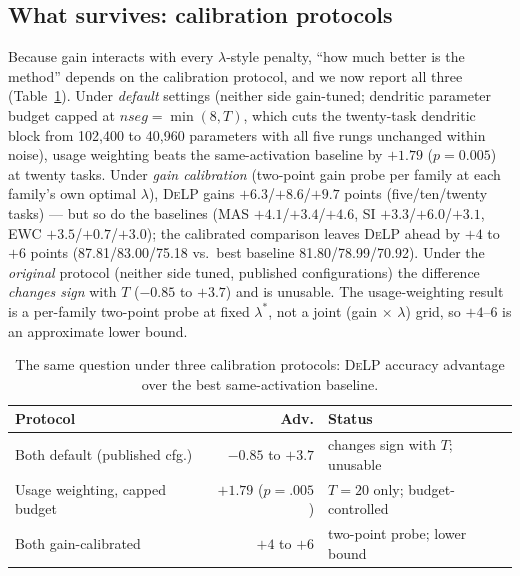 \documentclass[conference]{IEEEtran}
\newcommand{\delp}{\textsc{DeLP}}
\begin{document}
\subsection{What survives: calibration protocols}\label{sec:calib}
Because gain interacts with every $\lambda$-style penalty, ``how much better is the method''
depends on the calibration protocol, and we now report all three (Table~\ref{tab:proto}).
Under \emph{default} settings (neither side gain-tuned; dendritic parameter budget capped at
$nseg=\min(8,T)$, which cuts the twenty-task dendritic block from 102{,}400 to 40{,}960 parameters
with all five rungs unchanged within noise), usage weighting beats the same-activation baseline by
$+1.79$ ($p=0.005$) at twenty tasks. Under \emph{gain calibration} (two-point gain probe per
family at each family's own optimal $\lambda$), \delp{} gains $+6.3$/$+8.6$/$+9.7$ points
(five/ten/twenty tasks) --- but so do the baselines (MAS $+4.1$/$+3.4$/$+4.6$, SI
$+3.3$/$+6.0$/$+3.1$, EWC $+3.5$/$+0.7$/$+3.0$); the calibrated comparison leaves \delp{} ahead by
$+4$ to $+6$ points (87.81/83.00/75.18 vs.\ best baseline 81.80/78.99/70.92). Under the
\emph{original} protocol (neither side tuned, published configurations) the difference
\emph{changes sign} with $T$ ($-0.85$ to $+3.7$) and is unusable. The usage-weighting result is a
per-family two-point probe at fixed $\lambda^{\ast}$, not a joint (gain $\times$ $\lambda$) grid,
so $+4$--$6$ is an approximate lower bound.

\begin{table}[t]
\centering
\caption{The same question under three calibration protocols: \delp{} accuracy advantage over the
best same-activation baseline.}
\label{tab:proto}
\footnotesize
\setlength{\tabcolsep}{3pt}
\begin{tabular}{@{}p{}rp{}@{}}
\toprule
Protocol & Adv. & Status \\
\midrule
Both default (published cfg.) & $-0.85$ to $+3.7$ & changes sign with $T$; unusable \\
Usage weighting, capped budget & $+1.79$ ($p{=}.005$) & $T{=}20$ only; budget-controlled \\
Both gain-calibrated & $+4$ to $+6$ & two-point probe; lower bound \\
\bottomrule
\end{tabular}
\end{table}

\end{document}
